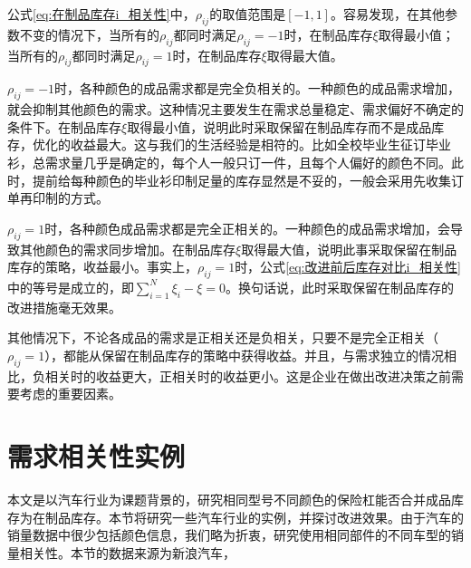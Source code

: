 公式\ref{eq:在制品库存i_相关性}中，$\rho_{ij}$的取值范围是$[-1,1]$。容易发现，在其他参数不变的情况下，当所有的$\rho_{ij}$都同时满足$\rho_{ij}=-1$时，在制品库存$\xi$取得最小值；当所有的$\rho_{ij}$都同时满足$\rho_{ij}=1$时，在制品库存$\xi$取得最大值。

$\rho_{ij}=-1$时，各种颜色的成品需求都是完全负相关的。一种颜色的成品需求增加，就会抑制其他颜色的需求。这种情况主要发生在需求总量稳定、需求偏好不确定的条件下。在制品库存$\xi$取得最小值，说明此时采取保留在制品库存而不是成品库存，优化的收益最大。这与我们的生活经验是相符的。比如全校毕业生征订毕业衫，总需求量几乎是确定的，每个人一般只订一件，且每个人偏好的颜色不同。此时，提前给每种颜色的毕业衫印制足量的库存显然是不妥的，一般会采用先收集订单再印制的方式。

$\rho_{ij}=1$时，各种颜色成品需求都是完全正相关的。一种颜色的成品需求增加，会导致其他颜色的需求同步增加。在制品库存$\xi$取得最大值，说明此事采取保留在制品库存的策略，收益最小。事实上，$\rho_{ij}=1$时，公式\ref{eq:改进前后库存对比i_相关性}中的等号是成立的，即$\sum_{i=1}^N\xi_i - \xi = 0$。换句话说，此时采取保留在制品库存的改进措施毫无效果。

其他情况下，不论各成品的需求是正相关还是负相关，只要不是完全正相关（$\rho_{ij}=1$），都能从保留在制品库存的策略中获得收益。并且，与需求独立的情况相比，负相关时的收益更大，正相关时的收益更小。这是企业在做出改进决策之前需要考虑的重要因素。









\section{需求相关性实例}

本文是以汽车行业为课题背景的，研究相同型号不同颜色的保险杠能否合并成品库存为在制品库存。本节将研究一些汽车行业的实例，并探讨改进效果。由于汽车的销量数据中很少包括颜色信息，我们略为折衷，研究使用相同部件的不同车型的销量相关性。本节的数据来源为新浪汽车\cite{__????}\cite{__????-1}，


















